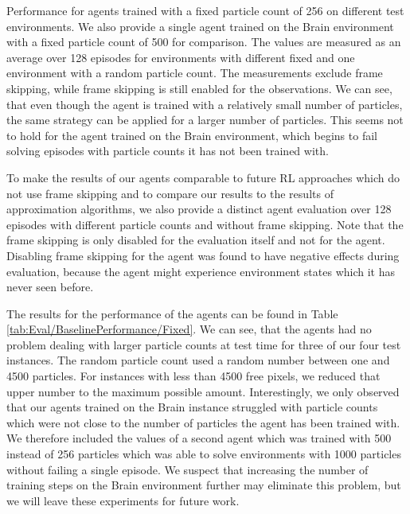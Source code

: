 \begin{table} [htp]
\begin{center}
\begin{threeparttable}
        \end{threeparttable}

    \end{center}
    \caption[Baseline Performance for Agents Trained with a Fixed Particle Count]{Performance for agents trained with a fixed particle count of 256 on different test environments. We also provide a single agent trained on the Brain environment with a fixed particle count of 500 for comparison. The values are measured as an average over 128 episodes for environments with different fixed and one environment with a random particle count. The measurements exclude frame skipping, while frame skipping is still enabled for the observations. We can see, that even though the agent is trained with a relatively small number of particles, the same strategy can be applied for a larger number of particles. This seems not to hold for the agent trained on the Brain environment, which begins to fail solving episodes with particle counts it has not been trained with.} \label{tab:Eval/BaselinePerformance/Fixed}
\end{table}

To make the results of our agents comparable to future RL approaches which do not use frame skipping and to compare our results to the results of approximation algorithms, we also provide a distinct agent evaluation over 128 episodes with different particle counts and without frame skipping. Note that the frame skipping is only disabled for the evaluation itself and not for the agent. Disabling frame skipping for the agent was found to have negative effects during evaluation, because the agent might experience environment states which it has never seen before.

The results for the performance of the agents can be found in Table \ref{tab:Eval/BaselinePerformance/Fixed}. We can see, that the agents had no problem dealing with larger particle counts at test time for three of our four test instances. The random particle count used a random number between one and 4500 particles. For instances with less than 4500 free pixels, we reduced that upper number to the maximum possible amount. Interestingly, we only observed that our agents trained on the Brain instance struggled with particle counts which were not close to the number of particles the agent has been trained with. We therefore included the values of a second agent which was trained with 500 instead of 256 particles which was able to solve environments with 1000 particles without failing a single episode. We suspect that increasing the number of training steps on the Brain environment further may eliminate this problem, but we will leave these experiments for future work.

